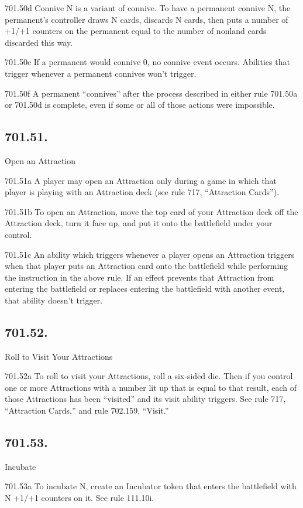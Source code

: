 701.50d Connive N is a variant of connive. To have a permanent connive N, the permanent’s controller draws N cards, discards N cards, then puts a number of +1/+1 counters on the permanent equal to the number of nonland cards discarded this way.

701.50e If a permanent would connive 0, no connive event occurs. Abilities that trigger whenever a permanent connives won’t trigger.

701.50f A permanent “connives” after the process described in either rule 701.50a or 701.50d is complete, even if some or all of those actions were impossible.

\subsection*{701.51.}
Open an Attraction

701.51a A player may open an Attraction only during a game in which that player is playing with an Attraction deck (see rule 717, “Attraction Cards”).

701.51b To open an Attraction, move the top card of your Attraction deck off the Attraction deck, turn it face up, and put it onto the battlefield under your control.

701.51c An ability which triggers whenever a player opens an Attraction triggers when that player puts an Attraction card onto the battlefield while performing the instruction in the above rule. If an effect prevents that Attraction from entering the battlefield or replaces entering the battlefield with another event, that ability doesn’t trigger.

\subsection*{701.52.}
Roll to Visit Your Attractions

701.52a To roll to visit your Attractions, roll a six-sided die. Then if you control one or more Attractions with a number lit up that is equal to that result, each of those Attractions has been “visited” and its visit ability triggers. See rule 717, “Attraction Cards,” and rule 702.159, “Visit.”

\subsection*{701.53.}
Incubate

701.53a To incubate N, create an Incubator token that enters the battlefield with N +1/+1 counters on it. See rule 111.10i.

